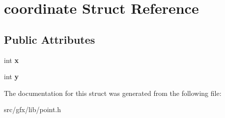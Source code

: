 \hypertarget{structcoordinate}{}\section{coordinate Struct Reference}
\label{structcoordinate}
\subsection*{Public Attributes}
\begin{DoxyCompactItemize}
\item 
\mbox{\label{structcoordinate_a8480dda1b2992713d4b0750bbdf1ee4e}} 
int {\bfseries x}
\item 
\mbox{\label{structcoordinate_a1f90088affc8f61daa374403f148eeb7}} 
int {\bfseries y}
\end{DoxyCompactItemize}


The documentation for this struct was generated from the following file\+:\begin{DoxyCompactItemize}
\item 
src/gfx/lib/point.\+h\end{DoxyCompactItemize}
